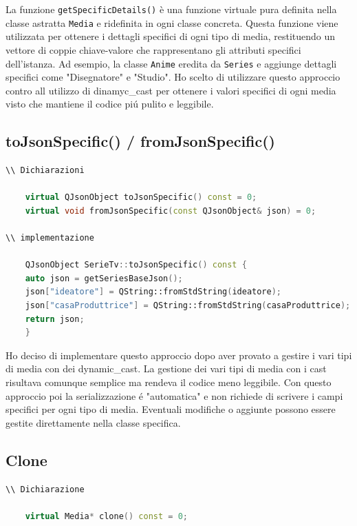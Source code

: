 \documentclass[a4paper,12pt]{article}
\begin{document}
La funzione \texttt{getSpecificDetails()} è una funzione virtuale pura definita nella classe astratta \texttt{Media} e ridefinita in ogni classe concreta. Questa funzione viene utilizzata per ottenere i dettagli specifici di ogni tipo di media, restituendo un vettore di coppie chiave-valore che rappresentano gli attributi specifici dell'istanza. Ad esempio, la classe \texttt{Anime} eredita da \texttt{Series} e aggiunge dettagli specifici come "Disegnatore" e "Studio". Ho scelto di utilizzare questo approccio contro all utilizzo di dinamyc\_cast per ottenere i valori specifici di ogni media visto che mantiene il codice piú pulito e leggibile.

\subsection{toJsonSpecific() / fromJsonSpecific()}

\begin{lstlisting}[language=cpp, style=cppstyle]
\\ Dichiarazioni

    virtual QJsonObject toJsonSpecific() const = 0;
    virtual void fromJsonSpecific(const QJsonObject& json) = 0;

\\ implementazione

    QJsonObject SerieTv::toJsonSpecific() const {
    auto json = getSeriesBaseJson();
    json["ideatore"] = QString::fromStdString(ideatore);
    json["casaProduttrice"] = QString::fromStdString(casaProduttrice);
    return json;
    }
\end{lstlisting}

Ho deciso di implementare questo approccio dopo aver provato a gestire i vari tipi di media con dei dynamic\_cast. La gestione dei vari tipi di media con i cast risultava comunque semplice ma rendeva il codice meno leggibile. Con questo approccio poi la serializzazione é "automatica" e non richiede di scrivere i campi specifici per ogni tipo di media. Eventuali modifiche o aggiunte possono essere gestite direttamente nella classe specifica.
\subsection{Clone}

\begin{lstlisting}[language=cpp, style=cppstyle]
\\ Dichiarazione

    virtual Media* clone() const = 0;
\end{lstlisting}
\end{document}
